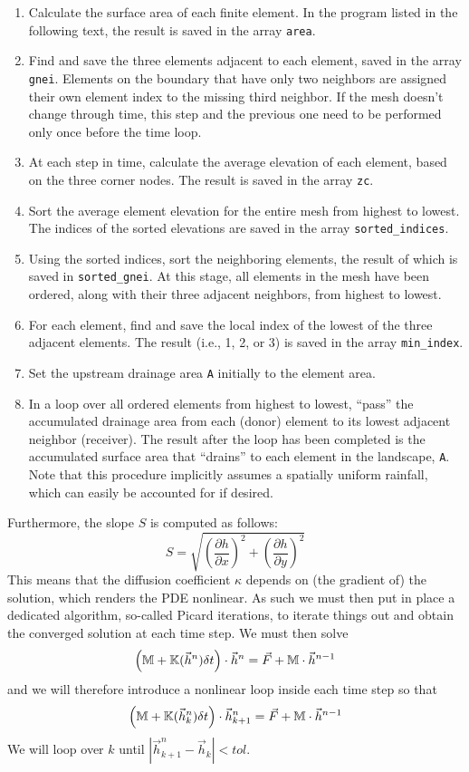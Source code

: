 \begin{enumerate}
\item Calculate the surface area of each finite element. In the program listed in the following text, the
result is saved in the array {\tt area}.
\item Find and save the three elements adjacent to each element, 
saved in the array {\tt gnei}. 
Elements on the boundary that have only two neighbors are assigned their own element index to the missing
third neighbor. If the mesh doesn't change through time, this step and the previous one need to
be performed only once before the time loop.
\item  At each step in time, calculate the average elevation of each element, based on the three corner
nodes. The result is saved in the array {\tt zc}.
\item Sort the average element elevation for the entire mesh from highest to lowest. The indices of the
sorted elevations are saved in the array {\tt sorted\_indices}.
\item Using the sorted indices, sort the neighboring elements, the result of which is saved in
{\tt sorted\_gnei}. At this stage, all elements in the mesh have been ordered, along with their three
adjacent neighbors, from highest to lowest.
\item For each element, find and save the local index of the lowest of the three adjacent elements. The
result (i.e., 1, 2, or 3) is saved in the array {\tt min\_index}.
\item Set the upstream drainage area {\tt A} initially to the element area.
\item In a loop over all ordered elements from highest to lowest, ``pass'' the accumulated drainage area
from each (donor) element to its lowest adjacent neighbor (receiver). The result after the loop has
been completed is the accumulated surface area that ``drains'' to each element in the landscape, {\tt A}. 
Note that this procedure implicitly assumes a spatially uniform rainfall, which can easily be
accounted for if desired.
\end{enumerate}

Furthermore, the slope $S$ is computed as follows:
\[
S=\sqrt{ \left(\frac{\partial h}{\partial x} \right)^2 + \left(\frac{\partial h}{\partial y} \right)^2 } 
\]
This means that the diffusion coefficient $\kappa$ depends on (the gradient of) the solution,
which renders the PDE nonlinear. As such we must then put in place a dedicated algorithm, 
so-called Picard iterations, to iterate things out and obtain the converged solution at each 
time step.
We must then solve 
\[
\left({\mathbb{M}}  + {\mathbb{K}}(\vec{h}^n) \delta t \right) \cdot \vec{h}^n = \vec{F}  + {\mathbb{M}} \cdot \vec{h}^{n-1}
\]
and we will therefore introduce a nonlinear loop inside each time step so that
\[
\left({\mathbb{M}}  + {\mathbb{K}}(\vec{h}^n_k) \delta t \right) \cdot \vec{h}^n_{k+1} = \vec{F}  + {\mathbb{M}} \cdot \vec{h}^{n-1}
\]
We will loop over $k$ until $|\vec{h}_{k+1}^n-\vec{h}_k|<tol$.

